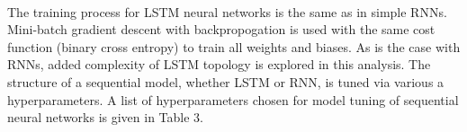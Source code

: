 \documentclass[11pt]{article}
\begin{document}
\begin{multicols*}{2}
                    \vspace{-5pt}

                    \paragraph{} 
                        The training process for LSTM neural networks is the same as in simple RNNs. 
                        Mini-batch gradient descent with backpropogation is used with the same cost function (binary cross entropy) to train all weights and biases.
                        As is the case with RNNs, added complexity of LSTM topology is explored in this analysis.
                        The structure of a sequential model, whether LSTM or RNN, is tuned via various a hyperparameters.
                        A list of hyperparameters chosen for model tuning of sequential neural networks is given in Table 3. 

                    \end{multicols*}
\end{document}
